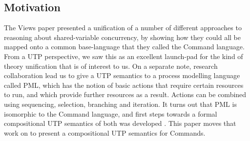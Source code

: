 \subsection{Motivation}\label{ssec:motivate}

The Views paper\cite{conf/popl/Dinsdale-YoungBGPY13}
presented a unification of a number of different approaches to reasoning
about shared-variable concurrency,
by showing how they could all be mapped onto a common base-language
that they called the Command language.
From a UTP perspective,
we saw this as an excellent launch-pad for the kind of theory unification
that is of interest to us.
On a separate note,
research collaboration lead us to give a UTP semantics to a process modelling
language called PML\cite{DBLP:journals/infsof/AtkinsonWN07},
which has the notion of basic actions that require certain resources to run,
and which provide further resources as a result.
Actions can be combined
using sequencing, selection, branching and iteration.
It turns out that PML is isomorphic to the Command language,
and first steps towards
a formal compositional UTP semantics of both was developed
\cite{conf/tase/BMN16}.
This paper moves that work on to present
a compositional UTP semantics for Commands.
